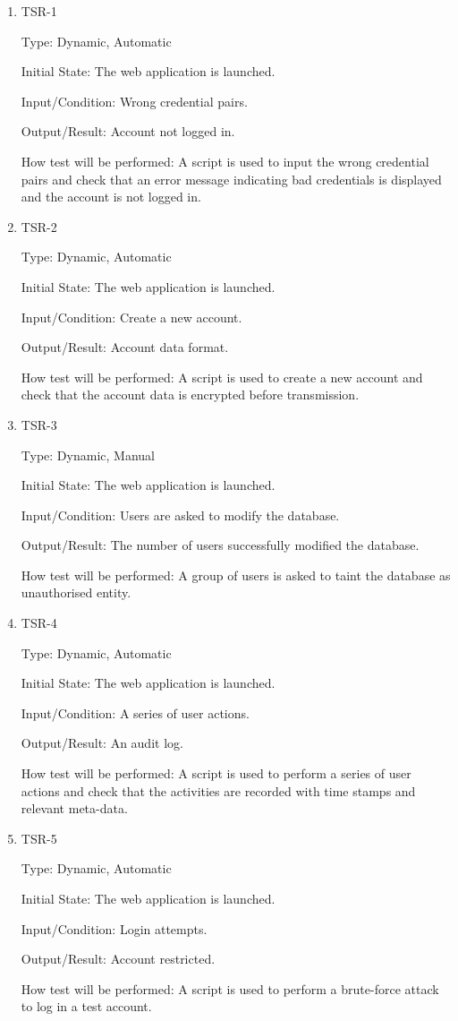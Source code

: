 \documentclass[12pt, titlepage]{article}
\begin{document}
\begin{enumerate}
\item{TSR-1\\}

Type: Dynamic, Automatic
					
Initial State: The web application is launched.
					
Input/Condition: Wrong credential pairs.
					
Output/Result: Account not logged in.
					
How test will be performed: A script is used to input the wrong credential pairs and check that an error message indicating bad credentials is displayed and the account is not logged in.

\item{TSR-2\\}

Type: Dynamic, Automatic
					
Initial State: The web application is launched.
					
Input/Condition: Create a new account.
					
Output/Result: Account data format.
					
How test will be performed: A script is used to create a new account and check that the account data is encrypted before transmission.

\item{TSR-3\\}

Type: Dynamic, Manual
					
Initial State: The web application is launched.
					
Input/Condition: Users are asked to modify the database.
					
Output/Result: The number of users successfully modified the database.
					
How test will be performed: A group of users is asked to taint the database as unauthorised entity.

\item{TSR-4\\}

Type: Dynamic, Automatic
					
Initial State: The web application is launched.
					
Input/Condition: A series of user actions.
					
Output/Result: An audit log.
					
How test will be performed: A script is used to perform a series of user actions and check that the activities are recorded with time stamps and relevant meta-data.

\item{TSR-5\\}

Type: Dynamic, Automatic
					
Initial State: The web application is launched.
					
Input/Condition: Login attempts.
					
Output/Result: Account restricted.
					
How test will be performed: A script is used to perform a brute-force attack to log in a test account.
\end{enumerate}
\end{document}

